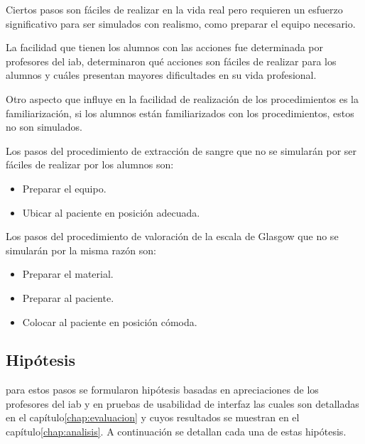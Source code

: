 \begin{itemize}
    Ciertos pasos son fáciles de realizar en la vida real pero requieren un
    esfuerzo significativo para ser simulados con realismo, como preparar el
    equipo necesario.

    La facilidad que tienen los alumnos con las acciones fue determinada por
    profesores del \Gls{iab}, determinaron qué acciones son fáciles de
    realizar para los alumnos y cuáles presentan mayores dificultades en su
    vida profesional.

    Otro aspecto que influye en la facilidad de realización de los
    procedimientos es la familiarización, si los alumnos están
    familiarizados con los procedimientos, estos no son simulados.
        
    Los pasos del procedimiento de extracción de sangre que no se simularán por 
    ser fáciles de realizar por los alumnos son:
        
    \begin{itemize}
        \item Preparar el equipo.
        \item Ubicar al paciente en posición adecuada.
    \end{itemize}
    
    Los pasos del procedimiento de valoración de la escala de Glasgow 
    que no se simularán por la misma razón son:
    \begin{itemize}
    \item Preparar el material.
    \item Preparar al paciente.
    \item Colocar al paciente en posición cómoda.
    \end{itemize}
        
\end{itemize}

\subsection{Hipótesis}
\label{sec:hipotesis}

 para estos pasos se formularon hipótesis basadas en
apreciaciones de los profesores del \Gls{iab} y en pruebas de usabilidad de
interfaz las cuales son detalladas en el capítulo\ref{chap:evaluacion} y cuyos
resultados se muestran en el capítulo\ref{chap:analisis}. A continuación se
detallan cada una de estas hipótesis.

